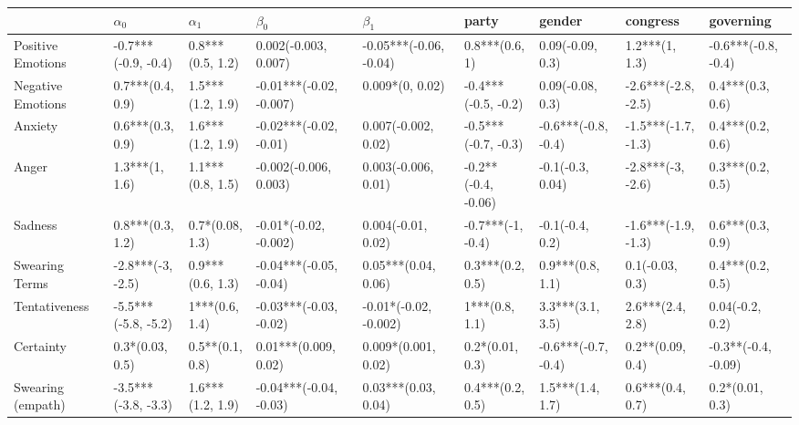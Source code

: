 \begin{tabular}{lllllllll}
\toprule
{} &           $\alpha_0$ &         $\alpha_1$ &                $\beta_0$ &               $\beta_1$ &                party &               gender &             congress &            governing \\
\midrule
Positive Emotions     &  -0.7***(-0.9, -0.4) &   0.8***(0.5, 1.2) &     0.002(-0.003, 0.007) &  -0.05***(-0.06, -0.04) &       0.8***(0.6, 1) &     0.09(-0.09, 0.3) &       1.2***(1, 1.3) &  -0.6***(-0.8, -0.4) \\
Negative Emotions     &     0.7***(0.4, 0.9) &   1.5***(1.2, 1.9) &  -0.01***(-0.02, -0.007) &         0.009*(0, 0.02) &  -0.4***(-0.5, -0.2) &     0.09(-0.08, 0.3) &  -2.6***(-2.8, -2.5) &     0.4***(0.3, 0.6) \\
Anxiety               &     0.6***(0.3, 0.9) &   1.6***(1.2, 1.9) &   -0.02***(-0.02, -0.01) &     0.007(-0.002, 0.02) &  -0.5***(-0.7, -0.3) &  -0.6***(-0.8, -0.4) &  -1.5***(-1.7, -1.3) &     0.4***(0.2, 0.6) \\
Anger                 &       1.3***(1, 1.6) &   1.1***(0.8, 1.5) &    -0.002(-0.006, 0.003) &     0.003(-0.006, 0.01) &  -0.2**(-0.4, -0.06) &     -0.1(-0.3, 0.04) &    -2.8***(-3, -2.6) &     0.3***(0.2, 0.5) \\
Sadness               &     0.8***(0.3, 1.2) &    0.7*(0.08, 1.3) &    -0.01*(-0.02, -0.002) &      0.004(-0.01, 0.02) &    -0.7***(-1, -0.4) &      -0.1(-0.4, 0.2) &  -1.6***(-1.9, -1.3) &     0.6***(0.3, 0.9) \\
Swearing Terms        &    -2.8***(-3, -2.5) &   0.9***(0.6, 1.3) &   -0.04***(-0.05, -0.04) &     0.05***(0.04, 0.06) &     0.3***(0.2, 0.5) &     0.9***(0.8, 1.1) &      0.1(-0.03, 0.3) &     0.4***(0.2, 0.5) \\
Tentativeness         &  -5.5***(-5.8, -5.2) &     1***(0.6, 1.4) &   -0.03***(-0.03, -0.02) &   -0.01*(-0.02, -0.002) &       1***(0.8, 1.1) &     3.3***(3.1, 3.5) &     2.6***(2.4, 2.8) &      0.04(-0.2, 0.2) \\
Certainty             &      0.3*(0.03, 0.5) &    0.5**(0.1, 0.8) &     0.01***(0.009, 0.02) &     0.009*(0.001, 0.02) &      0.2*(0.01, 0.3) &  -0.6***(-0.7, -0.4) &     0.2**(0.09, 0.4) &  -0.3**(-0.4, -0.09) \\
Swearing (empath)     &  -3.5***(-3.8, -3.3) &   1.6***(1.2, 1.9) &   -0.04***(-0.04, -0.03) &     0.03***(0.03, 0.04) &     0.4***(0.2, 0.5) &     1.5***(1.4, 1.7) &     0.6***(0.4, 0.7) &      0.2*(0.01, 0.3) \\

\end{tabular}
